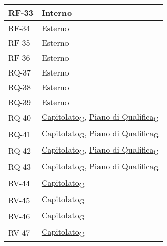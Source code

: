 \begin{longtable}{|>{\centering\arraybackslash}m{}|>{\centering\arraybackslash}m{}|}
	RF-33              & Interno                        \\\hline
	RF-34              & Esterno                        \\\hline
	RF-35              & Esterno                        \\\hline
	RF-36              & Esterno                        \\\hline
	RQ-37              & Esterno                        \\\hline
	RQ-38              & Esterno                        \\\hline
	RQ-39              & Esterno                        \\\hline
	RQ-40              & \href{https://7last.github.io/docs/rtb/documentazione-interna/glossario\#capitolato}{Capitolato\textsubscript{G}}, \href{https://7last.github.io/docs/rtb/documentazione-interna/glossario\#piano-di-qualifica}{Piano di Qualifica\textsubscript{G}} \\\hline
	RQ-41              & \href{https://7last.github.io/docs/rtb/documentazione-interna/glossario\#capitolato}{Capitolato\textsubscript{G}}, \href{https://7last.github.io/docs/rtb/documentazione-interna/glossario\#piano-di-qualifica}{Piano di Qualifica\textsubscript{G}} \\\hline
	RQ-42              & \href{https://7last.github.io/docs/rtb/documentazione-interna/glossario\#capitolato}{Capitolato\textsubscript{G}}, \href{https://7last.github.io/docs/rtb/documentazione-interna/glossario\#piano-di-qualifica}{Piano di Qualifica\textsubscript{G}} \\\hline
	RQ-43              & \href{https://7last.github.io/docs/rtb/documentazione-interna/glossario\#capitolato}{Capitolato\textsubscript{G}}, \href{https://7last.github.io/docs/rtb/documentazione-interna/glossario\#piano-di-qualifica}{Piano di Qualifica\textsubscript{G}} \\\hline
	RV-44              & \href{https://7last.github.io/docs/rtb/documentazione-interna/glossario\#capitolato}{Capitolato\textsubscript{G}}                     \\\hline
	RV-45              & \href{https://7last.github.io/docs/rtb/documentazione-interna/glossario\#capitolato}{Capitolato\textsubscript{G}}                     \\\hline
	RV-46              & \href{https://7last.github.io/docs/rtb/documentazione-interna/glossario\#capitolato}{Capitolato\textsubscript{G}}                     \\\hline
	RV-47              & \href{https://7last.github.io/docs/rtb/documentazione-interna/glossario\#capitolato}{Capitolato\textsubscript{G}}                     \\\hline

\end{longtable}
